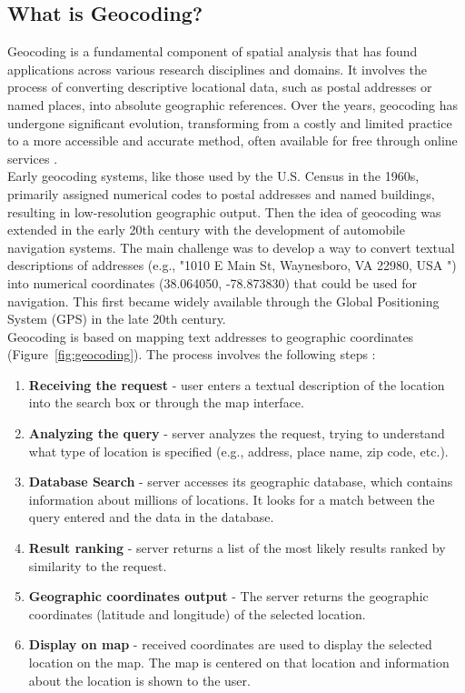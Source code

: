 \documentclass[10pt,oneside,english,a4paper]{article}
\begin{document}
\subsection{What is Geocoding?} \label{internal:geocoding}
Geocoding is a fundamental component of spatial analysis that has found applications across various research disciplines and domains. It involves the process of converting descriptive locational data, such as postal addresses or named places, into absolute geographic references. Over the years, geocoding has undergone significant evolution, transforming from a costly and limited practice to a more accessible and accurate method, often available for free through online services \cite{Goldberg2007}. 
\\Early geocoding systems, like those used by the U.S. Census in the 1960s, primarily assigned numerical codes to postal addresses and named buildings, resulting in low-resolution geographic output. Then the idea of geocoding was extended in the early 20th century with the development of automobile navigation systems. The main challenge was to develop a way to convert textual descriptions of addresses (e.g., "1010 E Main St, Waynesboro, VA 22980, USA ") into numerical coordinates (38.064050, -78.873830) that could be used for navigation. This first became widely available through the Global Positioning System (GPS) in the late 20th century.
\\Geocoding is based on mapping text addresses to geographic coordinates (Figure~\ref{fig:geocoding}). The process involves the following steps \cite{Behr2010}:

\begin{enumerate}
\item \textbf{Receiving the request} - user enters a textual description of the location into the search box or through the map interface.
\item \textbf{Analyzing the query} - server analyzes the request, trying to understand what type of location is specified (e.g., address, place name, zip code, etc.).
\item \textbf{Database Search} - server accesses its geographic database, which contains information about millions of locations. It looks for a match between the query entered and the data in the database.
\item \textbf{Result ranking} - server returns a list of the most likely results ranked by similarity to the request. 
\item \textbf{Geographic coordinates output} - The server returns the geographic coordinates (latitude and longitude) of the selected location.
\item \textbf{Display on map} - received coordinates are used to display the selected location on the map. The map is centered on that location and information about the location is shown to the user.
\end{enumerate}
\end{document}
